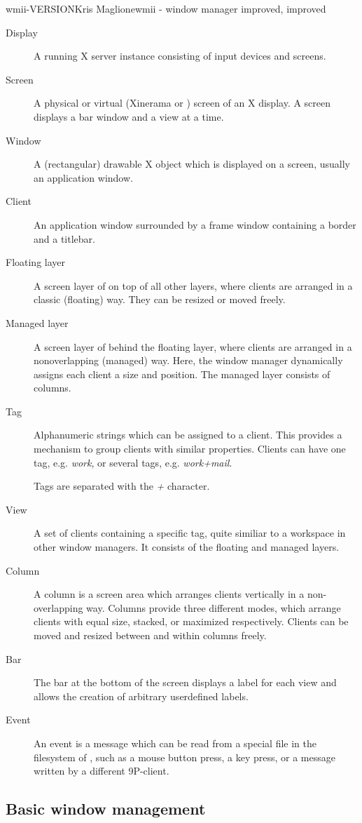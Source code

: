 \begin{Name}{1}{wmii-VERSION}{Kris Maglione}{}{wmii - window manager improved, improved}
\begin{description}
\item[Display] A running X server instance consisting of input devices
	and screens.
\item[Screen] A physical or virtual (Xinerama or ) screen
	of an X display. A screen displays a bar window and a view at a time.
\item[Window] A (rectangular) drawable X object which is displayed on a
	screen, usually an application window.
\item[Client] An application window surrounded by a frame window containing
	a border and a titlebar.
\item[Floating layer] A screen layer of  on top of all other
	layers, where clients are arranged in a classic (floating) way.
	They can be resized or moved freely.
\item[Managed layer] A screen layer of  behind the floating layer,
	where clients are arranged in a non\-overlapping (managed) way.  Here,
	the window manager dynamically assigns each client a size and position.
	The managed layer consists of columns.
\item[Tag] Alphanumeric strings which can be assigned to a client. This provides
	a mechanism to group clients with similar properties. Clients can have one
	tag, e.g. \emph{work}, or several tags, e.g.  \emph{work+mail}.

	Tags are separated with the \emph{+} character.
\item[View] A set of clients containing a specific tag, quite similiar to a
	workspace in other window managers.  It consists of the floating and
	managed layers.
\item[Column] A column is a screen area which arranges clients vertically in a
	non-overlapping way. Columns provide three different modes, which
	arrange clients with equal size, stacked, or maximized respectively.
	Clients can be moved and resized between and within columns freely.
\item[Bar] The bar at the bottom of the screen displays a label for each view and
	allows the creation of arbitrary user\-defined labels.
\item[Event] An event is a message which can be read from a special file in the
	filesystem of , such as a mouse button press, a key press, or
	a message written by a different 9P-client.
\end{description}

\subsection{Basic window management}


\end{Name}
